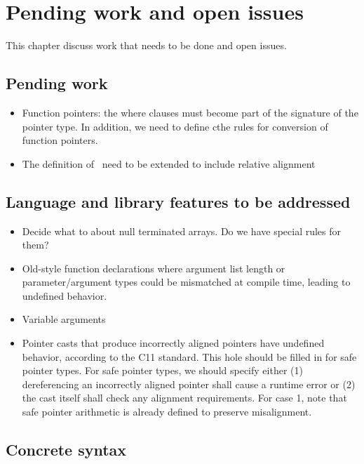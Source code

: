 
\chapter{Pending work and open issues}
\label{chapter:open-issues}

This chapter discuss work that needs to be done and open issues.

\section{Pending work}

\begin{itemize}
\item
  Function pointers: the where clauses must become part of the signature
  of the pointer type.  In addition, we need to define cthe 
  rules for conversion of function pointers.
\item The definition of \arrayviewT\ need to be extended to include
      relative alignment
\end{itemize}

\section{Language and library features to be addressed}

\begin{itemize}
\item
  Decide what to about null terminated arrays. Do we have special rules
  for them?
\item
  Old-style function declarations where argument list length or
  parameter/argument types could be mismatched at compile time, leading
  to undefined behavior.
\item
  Variable arguments
\item
  Pointer casts that produce incorrectly aligned pointers have undefined
  behavior, according to the C11 standard. This hole should be filled in
  for safe pointer types. For safe pointer types, we should specify
  either (1) dereferencing an incorrectly aligned pointer shall cause a
  runtime error or (2) the cast itself shall check any alignment
  requirements. For case 1, note that safe pointer arithmetic is already
  defined to preserve misalignment.
\end{itemize}

\section{Concrete syntax}
 
